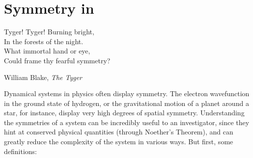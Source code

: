 \chapter{Symmetry in \pCf}	
\epigraph{Tyger! Tyger! Burning bright, \\
		In the forests of the night. \\
		What immortal hand or eye,\\
		Could frame thy fearful symmetry?}{William Blake, \emph{The Tyger}} 
Dynamical systems in physics often display symmetry. The electron wavefunction in the ground state of hydrogen, or the gravitational motion of a planet around a star, for instance, display very high degrees of spatial symmetry.  Understanding the symmetries of a system can be incredibly useful to an investigator, since they hint at conserved physical quantities (through Noether's Theorem), and can greatly reduce the complexity of the system in various ways. But first, some definitions: \\

